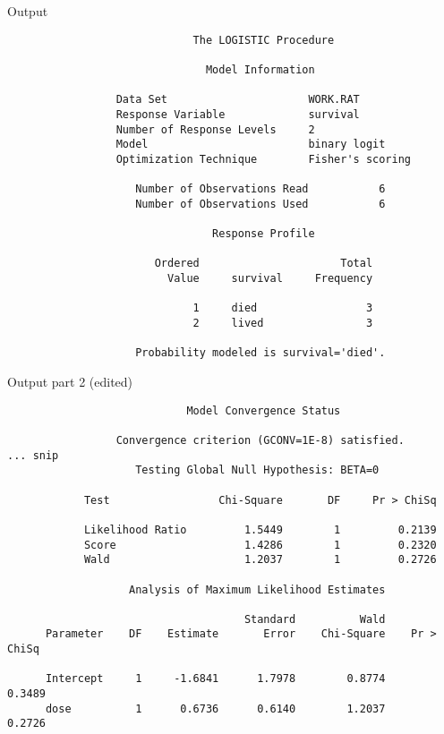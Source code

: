 \documentclass[pdf]{prosper}
\begin{document}
\begin{slide}{Output}

{\scriptsize
\begin{verbatim}
                             The LOGISTIC Procedure

                               Model Information

                 Data Set                      WORK.RAT
                 Response Variable             survival
                 Number of Response Levels     2
                 Model                         binary logit
                 Optimization Technique        Fisher's scoring

                    Number of Observations Read           6
                    Number of Observations Used           6

                                Response Profile

                       Ordered                      Total
                         Value     survival     Frequency

                             1     died                 3
                             2     lived                3

                    Probability modeled is survival='died'.

\end{verbatim}
}
  
\end{slide}

\begin{slide}{Output part 2 (edited)}

{\scriptsize
\begin{verbatim}
                            Model Convergence Status

                 Convergence criterion (GCONV=1E-8) satisfied.
... snip
                    Testing Global Null Hypothesis: BETA=0

            Test                 Chi-Square       DF     Pr > ChiSq

            Likelihood Ratio         1.5449        1         0.2139
            Score                    1.4286        1         0.2320
            Wald                     1.2037        1         0.2726

                   Analysis of Maximum Likelihood Estimates

                                     Standard          Wald
      Parameter    DF    Estimate       Error    Chi-Square    Pr > ChiSq

      Intercept     1     -1.6841      1.7978        0.8774        0.3489
      dose          1      0.6736      0.6140        1.2037        0.2726
\end{verbatim}
}
  
\end{slide}
\end{document}
